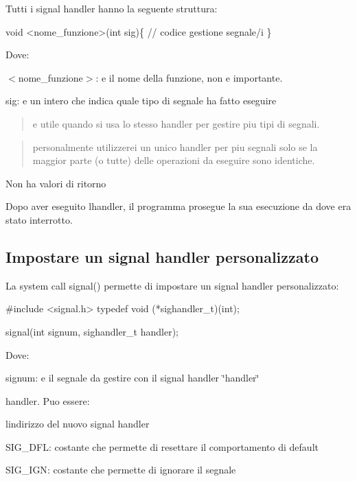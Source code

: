 Tutti i signal handler hanno la seguente struttura\+: 
\begin{DoxyCode}
void <nome\_funzione>(\textcolor{keywordtype}{int} sig)\{
    \textcolor{comment}{// codice gestione segnale/i}
\}
\end{DoxyCode}


Dove\+:
\begin{DoxyItemize}
\item {\ttfamily $<$nome\+\_\+funzione$>$}\+: e\textquotesingle{} il nome della funzione, non e\textquotesingle{} importante.
\item {\ttfamily sig}\+: e\textquotesingle{} un intero che indica quale tipo di segnale ha fatto eseguire \begin{quote}
e\textquotesingle{} utile quando si usa lo stesso handler per gestire piu\textquotesingle{} tipi di segnali. \end{quote}

\end{DoxyItemize}

\begin{quote}
personalmente utilizzerei un unico handler per piu\textquotesingle{} segnali solo se la maggior parte (o tutte) delle operazioni da eseguire sono identiche. \end{quote}

\begin{DoxyItemize}
\item Non ha valori di ritorno
\end{DoxyItemize}

Dopo aver eseguito l\textquotesingle{}handler, il programma prosegue la sua esecuzione da dove era stato interrotto.

\subsection*{Impostare un signal handler personalizzato}

La system call {\ttfamily signal()} permette di impostare un signal handler personalizzato\+: 
\begin{DoxyCode}
\textcolor{preprocessor}{#include <signal.h>}
\textcolor{keyword}{typedef} void (*sighandler\_t)(int);

signal(\textcolor{keywordtype}{int} signum, sighandler\_t handler);
\end{DoxyCode}


Dove\+:
\begin{DoxyItemize}
\item {\ttfamily signum}\+: e\textquotesingle{} il segnale da gestire con il signal handler \char`\"{}handler\char`\"{}
\item {\ttfamily handler}. Puo\textquotesingle{} essere\+:
\begin{DoxyItemize}
\item l\textquotesingle{}indirizzo del nuovo signal handler
\item {\ttfamily S\+I\+G\+\_\+\+D\+FL}\+: costante che permette di resettare il comportamento di default
\item {\ttfamily S\+I\+G\+\_\+\+I\+GN}\+: costante che permette di ignorare il segnale
\end{DoxyItemize}
\end{DoxyItemize}

